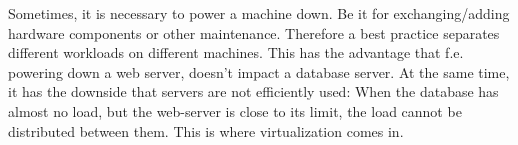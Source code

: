 \newline
Sometimes, it is necessary to power a machine down. Be it for exchanging/adding hardware components or other maintenance. Therefore a best practice separates different workloads on different machines. This has the advantage that f.e. powering down a web server, doesn't impact a database server. At the same time, it has the downside that servers are not efficiently used: When the database has almost no load, but the web-server is close to its limit, the load cannot be distributed between them. This is where virtualization comes in.






